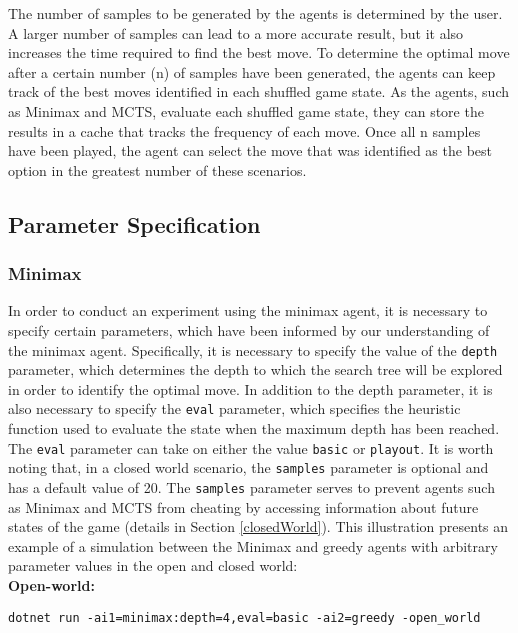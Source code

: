The number of samples to be generated by the agents is determined by the user. A larger number of samples can lead to a more accurate result, but it also increases the time required to find the best move. To determine the optimal move after a certain number (n) of samples have been generated, the agents can keep track of the best moves identified in each shuffled game state. As the agents, such as Minimax and MCTS, evaluate each shuffled game state, they can store the results in a cache that tracks the frequency of each move. Once all n samples have been played, the agent can select the move that was identified as the best option in the greatest number of these scenarios.

\subsection{Parameter Specification}
\label{paramSpecification}

\subsubsection{Minimax}

In order to conduct an experiment using the minimax agent, it is necessary to specify certain parameters, which have been informed by our understanding of the minimax agent. Specifically, it is necessary to specify the value of the \texttt{depth} parameter, which determines the depth to which the search tree will be explored in order to identify the optimal move. In addition to the depth parameter, it is also necessary to specify the \texttt{eval} parameter, which specifies the heuristic function used to evaluate the state when the maximum depth has been reached. The \texttt{eval} parameter can take on either the value \texttt{basic} or \texttt{playout}. It is worth noting that, in a closed world scenario, the \texttt{samples} parameter is optional and has a default value of 20. The \texttt{samples} parameter serves to prevent agents such as Minimax and MCTS from cheating by accessing information about future states of the game (details in Section \ref{closedWorld}). This illustration presents an example of a simulation between the Minimax and greedy agents with arbitrary parameter values in the open and closed world:\\

\textbf{Open-world: }
\begin{lstlisting}
dotnet run -ai1=minimax:depth=4,eval=basic -ai2=greedy -open_world
\end{lstlisting}


